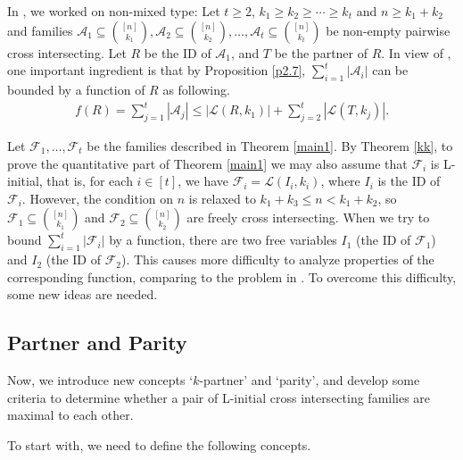 \documentclass[a4paper,11pt]{article}
\begin{document}
In \cite{HP+},  we worked on non-mixed type: Let $t\geq 2$, $k_1\geq k_2\geq \cdots \geq k_t$ and $n\geq k_1+k_2$  and families $\mathcal{A}_1\subseteq{[n]\choose k_1}, \mathcal{A}_2\subseteq{[n]\choose k_2}, \dots, \mathcal{A}_t\subseteq{[n]\choose k_t}$ be non-empty pairwise cross intersecting. Let $R$ be the ID of $\mathcal{A}_1$, and $T$  be the partner of $R$. In view of \cite{HP+}, one important ingredient is that by Proposition \ref{p2.7}, $\sum_{i=1}^t{|\mathcal{A}_i|}$ can be bounded by a function of $R$ as following.
\begin{align*}
f(R)=\sum_{j=1}^t|\mathcal{A}_j|\leq |\mathcal{L}(R, k_1)| +\sum_{j=2}^t |\mathcal{L}(T, k_j)| .
\end{align*}

Let $\mathcal{F}_1, \dots, \mathcal{F}_t$ be the families described in Theorem \ref{main1}.
By Theorem \ref{kk},  to prove the quantitative part of Theorem \ref{main1} we may  also assume that $\mathcal{F}_i$ is L-initial, that is, for each $i\in [t]$, we have $\mathcal{F}_i=\mathcal{L}(I_i, k_i)$, where $I_i$ is the ID of $\mathcal{F}_i$.
However,  the condition on $n$ is relaxed to $k_1+k_3\leq n <k_1+k_2$, so
 $\mathcal{F}_1\subseteq {[n]\choose k_1}$ and $\mathcal{F}_2\subseteq {[n]\choose k_2}$ are  freely cross intersecting. When we try to  bound $\sum_{i=1}^t{|\mathcal{F}_i|}$ by a function, there are two free variables $I_1$ (the ID of $\mathcal{F}_1$) and $I_2$ (the ID of $\mathcal{F}_2$). This causes more difficulty to analyze properties of the corresponding function, comparing to the problem in \cite{HP+}.  To overcome this difficulty,  some new ideas are needed.



   \subsection{Partner and Parity}


 Now, we introduce new concepts `$k$-partner' and `parity', and develop some criteria to determine whether  a pair of L-initial cross intersecting families are maximal to each other.


 To start with, we need to define the following concepts.
\end{document}
